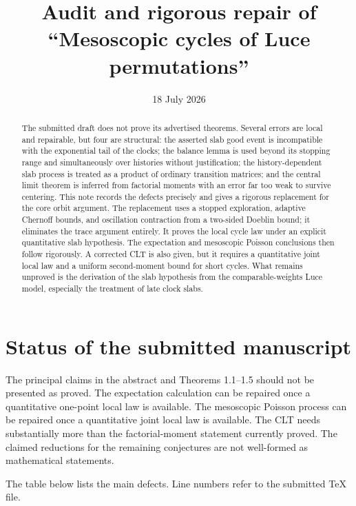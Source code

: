 \documentclass[11pt]{article}
\title{Audit and rigorous repair of\\
``Mesoscopic cycles of Luce permutations''}
\author{}
\date{18 July 2026}
\newcommand{\1}{\mathbf 1}
\theoremstyle{remark}
\begin{document}
\maketitle

\begin{abstract}
The submitted draft does not prove its advertised theorems.  Several errors are
local and repairable, but four are structural: the asserted slab good event is
incompatible with the exponential tail of the clocks; the balance lemma is
used beyond its stopping range and simultaneously over histories without
justification; the history-dependent slab process is treated as a product of
ordinary transition matrices; and the central limit theorem is inferred from
factorial moments with an error far too weak to survive centering.  This note
records the defects precisely and gives a rigorous replacement for the core
orbit argument.  The replacement uses a stopped exploration, adaptive
Chernoff bounds, and oscillation contraction from a two-sided Doeblin bound; it
eliminates the trace argument entirely.  It proves the local cycle law under an
explicit quantitative slab hypothesis.  The expectation and mesoscopic
Poisson conclusions then follow rigorously.  A corrected CLT is also given,
but it requires a quantitative joint local law and a uniform second-moment
bound for short cycles.  What remains unproved is the derivation of the slab
hypothesis from the comparable-weights Luce model, especially the treatment of
late clock slabs.
\end{abstract}

\section{Status of the submitted manuscript}

The principal claims in the abstract and Theorems 1.1--1.5 should not be
presented as proved.  The expectation calculation can be repaired once a
quantitative one-point local law is available.  The mesoscopic Poisson process
can be repaired once a quantitative joint local law is available.  The CLT
needs substantially more than the factorial-moment statement currently
proved.  The claimed reductions for the remaining conjectures are not
well-formed as mathematical statements.

The table below lists the main defects.  Line numbers refer to the submitted
TeX file.
\end{document}
